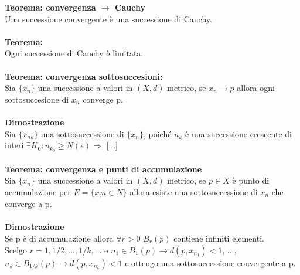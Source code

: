 \documentclass{article}
\begin{document}
\textbf{Teorema: convergenza $\rightarrow$ Cauchy}\\
Una successione convergente è una successione di Cauchy.\\\\
\textbf{Teorema:}\\
Ogni successione di Cauchy è limitata.\\\\
\textbf{Teorema: convergenza sottosuccesioni:}\\
Sia $\{x_n\}$ una successione a valori in $(X,d)$ metrico, se $x_n\rightarrow p$ allora ogni sottosuccesione di $x_n$ converge p.\\\\
\textbf{Dimostrazione}\\
Sia $\{x_{nk}\}$ una sottosuccessione di $\{x_n\}$, poiché $n_k$ è una successione crescente di interi $\exists K_0:n_{k_0}\geq N(\epsilon)\Rightarrow$ [...]\\\\
\textbf{Teorema: convergenza e punti di accumulazione}\\
Sia $\{x_n\}$ una successione a valori in $(X,d)$ metrico, se $p\in X$ è punto di accumulazione per $E=\{x_;n\in N\}$ allora esiste una sottosuccessione di $x_n$ che converge a p.\\\\
\textbf{Dimostrazione}\\
Se p è di accumulazione allora $\forall r>0$ $B_r(p)$ contiene infiniti elementi.\\
Scelgo $r=1,1/2,...,1/k,...$ e $n_1\in B_1(p)\rightarrow d(p,x_{n_1})<1$, ..., $n_k\in B_{1/k}(p)\rightarrow d(p,x_{n_k})<1$ e ottengo una sottosuccessione convergente a p.
\end{document}
